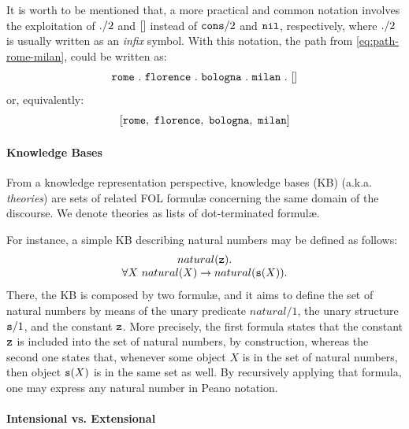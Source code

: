 \documentclass[12pt,a4paper,openright,twoside]{book}
\begin{document}
It is worth to be mentioned that, a more practical and common notation involves the exploitation of $\mathtt{.}/2$ and $\mathtt{[]}$ instead of $\mathtt{cons}/2$ and $\mathtt{nil}$, respectively, where $\mathtt{.}/2$ is usually written as an \emph{infix} symbol.
%
With this notation, the path from \cref{eq:path-rome-milan}, could be written as:
%
\begin{equation*}
    \mathtt{rome \mathtt{~.~} florence \mathtt{~.~} bologna \mathtt{~.~} milan \mathtt{~.~} []}
\end{equation*}
%
or, equivalently:
%
\begin{equation*}
    \functor{[rome,\ florence,\ bologna,\ milan]}
\end{equation*}

\paragraph{Knowledge Bases}

From a knowledge representation perspective, knowledge bases (KB) (a.k.a. \emph{theories}) are sets of related FOL formul\ae{} concerning the same domain of the discourse.
%
We denote theories as lists of dot-terminated formul\ae.

For instance, a simple KB describing natural numbers may be defined as follows:
%
\begin{equation}\label{eq:kb-peano-naturals}
    \begin{array}{c}
        natural(\mathtt{z}).
        \\
        \forall X\ natural(X) \rightarrow natural(\mathtt{s}(X)).
    \end{array}
\end{equation}
%
There, the KB is composed by two formul\ae, and it aims to define the set of natural numbers by means of the unary predicate $natural/1$, the unary structure $\mathtt{s}/1$, and the constant $\mathtt{z}$.
%
More precisely, the first formula states that the constant $\mathtt{z}$ is included into the set of natural numbers, by construction, whereas the second one states that, whenever some object $X$ is in the set of natural numbers, then object $\mathtt{s}(X)$ is in the same set as well.
%
By recursively applying that formula, one may express any natural number in Peano notation.

\paragraph{Intensional vs. Extensional}
\end{document}
